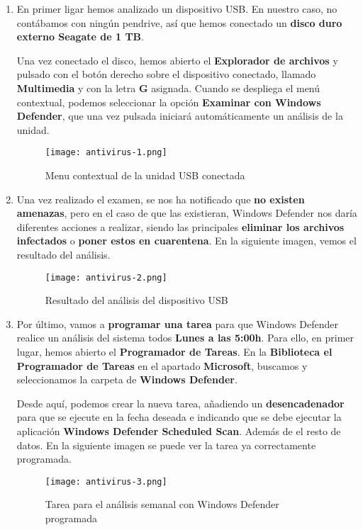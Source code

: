 \begin{enumerate}
    \item En primer ligar hemos analizado un dispositivo USB. En nuestro caso, no contábamos con ningún pendrive, así que hemos conectado un \textbf{disco duro externo Seagate de 1 TB}.

    Una vez conectado el disco,  hemos abierto el \textbf{Explorador de archivos} y pulsado con el botón derecho sobre el dispositivo conectado, llamado \textbf{Multimedia} y con la letra \textbf{G} asignada. Cuando se despliega el menú contextual, podemos seleccionar la opción \textbf{Examinar con Windows Defender}, que una vez pulsada iniciará automáticamente un análisis de la unidad.

    \begin{figure}[H]
        \centering
        \texttt{[image: antivirus-1.png]}
        \caption{Menu contextual de la unidad USB conectada}
    \end{figure}

    \item Una vez realizado el examen, se nos ha notificado que \textbf{no existen amenazas}, pero en el caso de que las existieran, Windows Defender nos daría diferentes acciones a realizar, siendo las principales \textbf{eliminar los archivos infectados} o \textbf{poner estos en cuarentena}. En la siguiente imagen, vemos el resultado del análisis.

    \begin{figure}[H]
        \centering
        \texttt{[image: antivirus-2.png]}
        \caption{Resultado del análisis del dispositivo USB}
    \end{figure}

    \item Por último, vamos a \textbf{programar una tarea} para que Windows Defender realice un análisis del sistema todos \textbf{Lunes a las 5:00h}. Para ello, en primer lugar, hemos abierto el \textbf{Programador de Tareas}. En la \textbf{Biblioteca el Programador de Tareas} en el apartado \textbf{Microsoft}, buscamos y seleccionamos la carpeta de \textbf{Windows Defender}.

    Desde aquí, podemos crear la nueva tarea, añadiendo un \textbf{desencadenador} para que se ejecute en la fecha deseada e indicando que se debe ejecutar la aplicación \textbf{Windows Defender Scheduled Scan}. Además de el resto de datos. En la siguiente imagen se puede ver la tarea ya correctamente programada.

    \begin{figure}[H]
        \centering
        \texttt{[image: antivirus-3.png]}
        \caption{Tarea para el análisis semanal con Windows Defender programada}
    \end{figure}
\end{enumerate}

